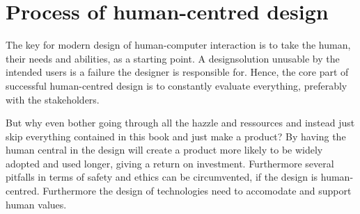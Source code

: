 \chapter{Process of human-centred design} \label{chap:process}
The key for modern design of human-computer interaction is to take the human, their needs and abilities, as a starting point. A designsolution unusable by the intended users is a failure the designer is responsible for. Hence, the core part of successful human-centred design is to constantly evaluate everything, preferably with the stakeholders.

But why even bother going through all the hazzle and ressources and instead just skip everything contained in this book and just make a product? By having the human central in the design will create a product more likely to be widely adopted and used longer, giving a return on investment. Furthermore several pitfalls in terms of safety and ethics can be circumvented, if the design is human-centred. Furthermore the design of technologies need to accomodate and support human values. \cite[p. 20-22]{benyon_14}




